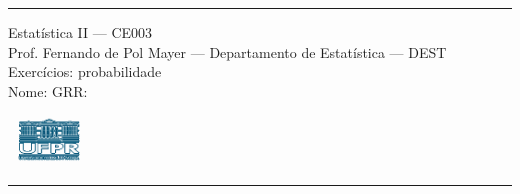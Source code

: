 \documentclass[a4paper,11pt,fleqn]{article}\usepackage[]{graphicx}\usepackage[]{color}
\theoremstyle{definition}
\begin{document}
\reversemarginpar %





\hrule
\vspace{0.3cm}

\begin{minipage}[c]{.85\textwidth}
  Estatística II --- CE003 \\
  Prof. Fernando de Pol Mayer --- Departamento de Estatística --- DEST \\
  Exercícios: probabilidade \\
  Nome:   \hfill GRR: \hspace{2cm}
\end{minipage}\hfill
\begin{minipage}[c]{.15\textwidth}
\flushright
\includegraphics[width=2.2cm]{../img/ufpr-logo.png}
\end{minipage}

\vspace{0.3cm}
\hrule
\vspace{0.3cm}
\end{document}
